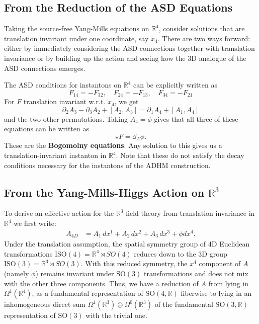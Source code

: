 	\subsection{From the Reduction of the ASD Equations}
	Taking the source-free Yang-Mills equations on $\mathbb R^4$, consider solutions that are translation invariant under one coordinate, say $x_4$. There are two ways forward: either by immediately considering the ASD connections together with translation invariance or by building up the action and seeing how the 3D analogue of the ASD connections emerges. 
	
	\begin{obs}
		The ASD conditions for instantons on $\mathbb R^4$ can be explicitly written as
		\begin{equation}
			F_{14}=-F_{32}, \quad F_{24}=-F_{13}, \quad F_{34}=-F_{21}
		\end{equation}
		For $F$ translation invariant w.r.t. $x_4$, we get
		\begin{equation}
			\partial_{2} A_3 - \partial_3 A_2 + [A_2, A_3] = \partial_1 A_4 + [A_1, A_4]
		\end{equation}
		and the two other permutations. Taking $A_4 = \phi$ gives that all three of these equations can be written as
		\begin{equation}
			\star F = \dd_A \phi.
		\end{equation}
		These are the \textbf{Bogomolny equations}. Any solution to this gives us a translation-invariant instanton in $\mathbb R^4$. Note that these do not satisfy the decay conditions necessary for the instantons of the ADHM construction.
	\end{obs}
	
	\subsection{From the Yang-Mills-Higgs Action on $\mathbb R^3$} %
	\label{sub:from_the_yang_mills_higgs_action_on_mathbb_r_3}

	To derive an effective action for the $\mathbb R^3$ field theory from translation invariance in $\mathbb R^4$ we first write:
	\begin{equation*}
		\begin{aligned}
			A_{4D} &= A_1\, dx^1 + A_2\, dx^2 + A_3\, dx^3 + \phi dx^4.
		\end{aligned}
	\end{equation*}
	Under the translation assumption, the spatial symmetry group of 4D Euclidean transformations $\mathrm{ISO}(4) = \mathbb R^4 \rtimes SO(4)$ reduces down to the 3D group $\mathrm{ISO}(3) = \mathbb R^3 \rtimes SO(3)$. With this reduced symmetry, the $x^4$ component of $A$ (namely $\phi$) remains invariant under $\mathrm{SO}(3)$ transformations and does not mix with the other three components. Thus, we have a reduction of $A$ from lying in $\Omega^1(\mathbb R^4)$, as a fundamental representation of $\mathrm{SO}(4, \mathbb R)$ fiberwise to lying in an inhomogeneous direct sum $\Omega^1(\mathbb R^3) \oplus \Omega^0(\mathbb R^3)$ of the fundamental $\mathrm{SO}(3, \mathbb R)$ representation of $\mathrm{SO}(3)$ with the trivial one.
	
